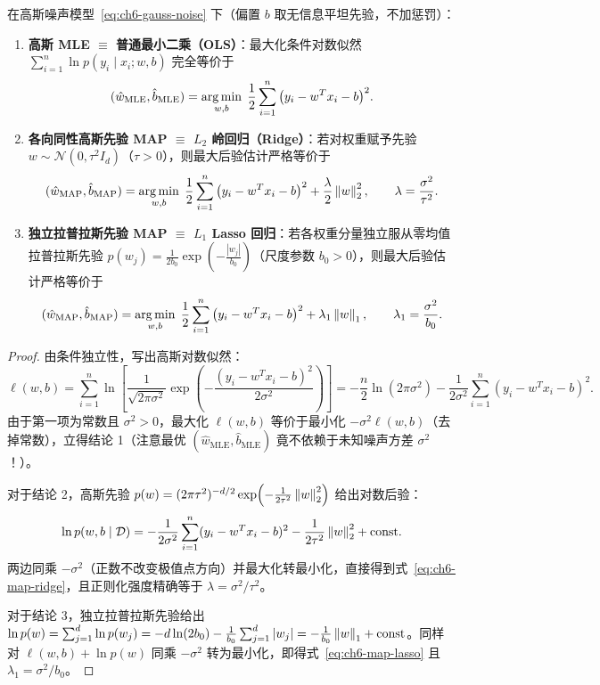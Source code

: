 \begin{thmBox}
\begin{theorem}
\label{thm:ch6-linreg-prob}
在高斯噪声模型~\eqref{eq:ch6-gauss-noise} 下（偏置 $b$ 取无信息平坦先验，不加惩罚）：
\begin{enumerate}
  \item \textbf{高斯 MLE $\equiv$ 普通最小二乘（OLS）}：最大化条件对数似然 $\sum_{i=1}^n \ln p(y_i \mid x_i; w, b)$ 完全等价于
  \[
    (\hat{w}_{\text{MLE}}, \hat{b}_{\text{MLE}})
    = \operatorname*{arg\,min}_{w, b}\; \frac{1}{2}\sum_{i=1}^n \big(y_i - w^T x_i - b\big)^2.
  \]
  \item \textbf{各向同性高斯先验 MAP $\equiv$ $L_2$ 岭回归（Ridge）}：若对权重赋予先验 $w \sim \mathcal{N}(0, \tau^2 I_d)$（$\tau > 0$），则最大后验估计严格等价于
  \begin{equation}
    (\hat{w}_{\text{MAP}}, \hat{b}_{\text{MAP}})
    = \operatorname*{arg\,min}_{w, b}\; \frac{1}{2}\sum_{i=1}^n \big(y_i - w^T x_i - b\big)^2 + \frac{\lambda}{2}\left\|w\right\|_2^2,
    \qquad
    \lambda = \frac{\sigma^2}{\tau^2}.
    \label{eq:ch6-map-ridge}
  \end{equation}
  \item \textbf{独立拉普拉斯先验 MAP $\equiv$ $L_1$ Lasso 回归}：若各权重分量独立服从零均值拉普拉斯先验 $p(w_j) = \frac{1}{2b_0}\exp\!\left(-\frac{|w_j|}{b_0}\right)$（尺度参数 $b_0 > 0$），则最大后验估计严格等价于
  \begin{equation}
    (\hat{w}_{\text{MAP}}, \hat{b}_{\text{MAP}})
    = \operatorname*{arg\,min}_{w, b}\; \frac{1}{2}\sum_{i=1}^n \big(y_i - w^T x_i - b\big)^2 + \lambda_1 \left\|w\right\|_1,
    \qquad
    \lambda_1 = \frac{\sigma^2}{b_0}.
    \label{eq:ch6-map-lasso}
  \end{equation}
\end{enumerate}
\end{theorem}
\end{thmBox}

\begin{proof}
由条件独立性，写出高斯对数似然：
\[
  \ell(w, b)
  = \sum_{i=1}^n \ln \left[\frac{1}{\sqrt{2\pi\sigma^2}}\exp\!\left(-\frac{(y_i - w^T x_i - b)^2}{2\sigma^2}\right)\right]
  = -\frac{n}{2}\ln(2\pi\sigma^2) - \frac{1}{2\sigma^2}\sum_{i=1}^n (y_i - w^T x_i - b)^2.
\]
由于第一项为常数且 $\sigma^2 > 0$，最大化 $\ell(w,b)$ 等价于最小化 $-\sigma^2\ell(w,b)$（去掉常数），立得结论 1（注意最优 $(\hat{w}_{\text{MLE}}, \hat{b}_{\text{MLE}})$ 竟不依赖于未知噪声方差 $\sigma^2$！）。

对于结论 2，高斯先验 $p(w) = (2\pi\tau^2)^{-d/2}\exp\!\left(-\frac{1}{2\tau^2}\left\|w\right\|_2^2\right)$ 给出对数后验：
\[
  \ln p(w, b \mid \mathcal{D})
  = -\frac{1}{2\sigma^2}\sum_{i=1}^n (y_i - w^T x_i - b)^2 - \frac{1}{2\tau^2}\left\|w\right\|_2^2 + \text{const}.
\]
两边同乘 $-\sigma^2$（正数不改变极值点方向）并最大化转最小化，直接得到式~\eqref{eq:ch6-map-ridge}，且正则化强度精确等于 $\lambda = \sigma^2 / \tau^2$。

对于结论 3，独立拉普拉斯先验给出 $\ln p(w) = \sum_{j=1}^d \ln p(w_j) = -d\ln(2b_0) - \frac{1}{b_0}\sum_{j=1}^d |w_j| = -\frac{1}{b_0}\left\|w\right\|_1 + \text{const}$。同样对 $\ell(w,b) + \ln p(w)$ 同乘 $-\sigma^2$ 转为最小化，即得式~\eqref{eq:ch6-map-lasso} 且 $\lambda_1 = \sigma^2 / b_0$。
\end{proof}

